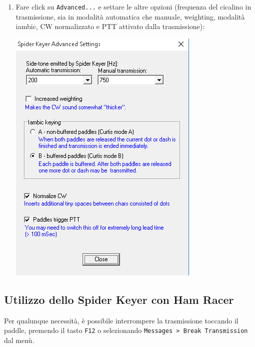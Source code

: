 \begin{enumerate}
\begin{center}
	\end{center}
\pagebreak
	\item Fare click su \texttt{Advanced...} e settare le altre opzioni (frequenza del cicalino in trasmissione, sia in modalit\`a automatica che manuale, weighting, modalit\`a iambic, CW normalizzato e PTT attivato dalla trasmissione):
	\begin{center}
		\includegraphics[width=\linewidth]{./config07.png}
	\end{center}
\end{enumerate}



\pagebreak
\subsection{Utilizzo dello Spider Keyer con Ham Racer}
Per qualunque necessit\`a, \`e possibile interrompere la trasmissione toccando il paddle, premendo il tasto \texttt{F12} o selezionando \texttt{Messages > Break Transmission} dal men\`u.

